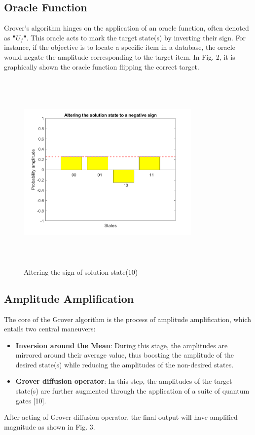 \documentclass[conference]{IEEEtran}
\begin{document}
\subsection{Oracle Function}
Grover’s algorithm hinges on the application of an oracle
function, often denoted as \textbf{"$ U_f $"}. This oracle acts to mark
the target state(s) by inverting their sign. For instance, if the
objective is to locate a specific item in a database, the oracle
would negate the amplitude corresponding to the target item.
In Fig. 2, it is graphically shown the oracle function flipping
the correct target.

\begin{figure}[htbp]
	\centerline{\includegraphics[width=9cm,height=10cm,keepaspectratio]{fig2.png}}
	\caption{Altering the sign of solution state(10)}
	\label{fig2}
\end{figure}

\subsection{Amplitude Amplification}
The core of the Grover algorithm is the process of amplitude
amplification, which entails two central maneuvers:
\begin{itemize}
	\item \textbf{Inversion around the Mean}: During this stage, the amplitudes are mirrored around their average value, thus  boosting the amplitude of the desired state(s) while reducing the amplitudes of the non-desired states.
	\item \textbf{Grover diffusion operator}: In this step, the amplitudes
	      of the target state(s) are further augmented through the
	      application of a suite of quantum gates [10].

\end{itemize}
After acting of Grover diffusion operator, the final output will
have amplified magnitude as shown in Fig. 3.
\end{document}
